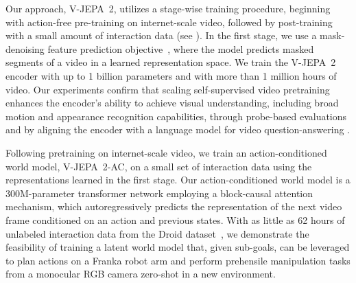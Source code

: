 \documentclass[]{fairmeta}
\newcommand{\model}{V-JEPA~2\xspace}
\newcommand{\acModel}{V-JEPA~2-AC\xspace}
\begin{document}
Our approach, \model, utilizes a stage-wise training procedure, beginning with action-free pre-training on internet-scale video, followed by post-training with a small amount of interaction data (see ).
In the first stage, we use a mask-denoising feature prediction objective~\citep{assran2023self,bardes2024revisiting}, where the model predicts masked segments of a video in a learned representation space.
We train the \model  encoder with up to 1 billion parameters and with more than 1 million hours of video.
Our experiments confirm that scaling self-supervised  video pretraining enhances the encoder's ability to achieve visual understanding, including broad motion and appearance recognition capabilities, through probe-based evaluations and by aligning the encoder with a language model for video question-answering \citep{benno2024, patraucean2023perception, liu2024tempcompass, cai2024temporalbench, shangguan2024tomato}. 


Following pretraining on internet-scale video, we train an action-conditioned world model, \acModel, on a small set of interaction data using the representations learned in the first stage.
Our action-conditioned world model is a 300M-parameter transformer network employing a block-causal attention mechanism, which autoregressively predicts the representation of the next video frame conditioned on an action and previous states.
With as little as 62 hours of unlabeled interaction data from the Droid dataset~\citep{khazatsky2024droid}, we demonstrate the feasibility of training a latent world model that, given sub-goals, can be leveraged to plan actions on a Franka robot arm and perform prehensile manipulation tasks from a monocular RGB camera zero-shot in a new environment.
\end{document}
